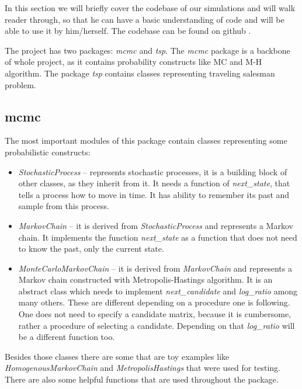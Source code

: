 In this section we will briefly cover the codebase of our simulations and will walk reader through, so that he can have a basic understanding of code and will be able to use it by him/herself. The codebase can be found on github \cite{Homeomor72:online}. 

The project has two packages: \textit{mcmc} and \textit{tsp}. The \textit{mcmc} package is a backbone of whole project, as it contains probability constructs like MC and M-H algorithm. The package \textit{tsp} contains classes representing traveling salesman problem.

\subsection{mcmc}
	The most important modules of this package contain classes representing some probabilistic constructs:
	\begin{itemize}
		\item \textit{StochasticProcess} -- represents stochastic processes, it is a building block of other classes, as they inherit from it. It needs a function of \textit{next\_state}, that tells a process how to move in time. It has ability to remember its past and sample from this process.
		\item \textit{MarkovChain} -- it is derived from \textit{StochasticProcess} and represents a Markov chain. It implements the function \textit{next\_state} as a function that does not need to know the past, only the current state.
		\item \textit{MonteCarloMarkovChain} -- it is derived from \textit{MarkovChain} and represents a Markov chain constructed with Metropolis-Hastings algorithm. It is an abstract class which needs to implement \textit{next\_candidate} and \textit{log\_ratio} among many others. These are different depending on a procedure one is following. One does not need to specify a candidate matrix, because it is cumbersome, rather a procedure of selecting a candidate. Depending on that \textit{log\_ratio} will be a different function too.
	\end{itemize}

Besides those classes there are some that are toy examples like \textit{HomogenousMarkovChain} and \textit{MetropolisHastings} that were used for testing. There are also some helpful functions that are used throughout the package.

